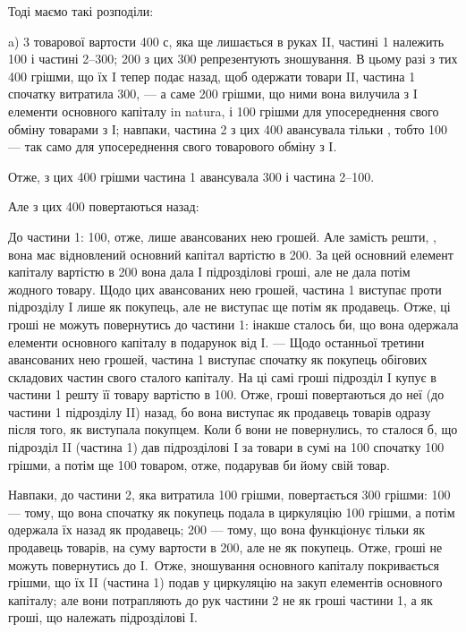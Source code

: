 Тоді маємо такі розподіли:

a) 3 товарової вартости \deq{} 400 с, яка ще лишається в руках II, частині
1 належить 100 і частині 2--300; 200 з цих 300 репрезентують
зношування. В цьому разі з тих 400 грішми, що їх I тепер
подає назад, щоб одержати товари II, частина 1 спочатку витратила 300,
— а саме 200 грішми, що ними вона вилучила з I елементи основного
капіталу in natura, і 100 грішми для упосереднення свого обміну товарами
з І; навпаки, частина 2 з цих 400 авансувала тільки , тобто
100 — так само для упосереднення свого товарового обміну з I.

Отже, з цих 400 грішми частина 1 авансувала 300 і частина
2--100.

Але з цих 400 повертаються назад:

До частини 1: 100, отже, лише  авансованих нею грошей. Але
замість решти, , вона має відновлений основний капітал вартістю в 200.
За цей основний елемент капіталу вартістю в 200 вона дала І підрозділові
гроші, але не дала потім жодного товару. Щодо цих 
авансованих нею грошей, частина 1 виступає проти підрозділу I лише як
покупець, але не виступає ще потім як продавець. Отже, ці гроші
не можуть повернутись до частини 1: інакше сталось би, що вона одержала
елементи основного капіталу в подарунок від I. — Щодо останньої
третини авансованих нею грошей, частина 1 виступає спочатку
як покупець обігових складових частин свого сталого капіталу. На ці
самі гроші підрозділ I купує в частини 1 решту її товару вартістю
в 100. Отже, гроші повертаються до неї (до частини 1 підрозділу II)
назад, бо вона виступає як продавець товарів одразу після того, як
виступала покупцем. Коли б вони не повернулись, то сталося б, що
підрозділ II (частина 1) дав підрозділові I за товари в сумі на 100 спочатку
100 грішми, а потім ще 100 товаром, отже, подарував би йому
свій товар.

Навпаки, до частини 2, яка витратила 100 грішми, повертається
300 грішми: 100 — тому, що вона спочатку як покупець подала в циркуляцію
100 грішми, а потім одержала їх назад як продавець; 200 —
тому, що вона функціонує тільки як продавець товарів, на суму вартости
в 200, але не як покупець. Отже, гроші не можуть повернутись до I.~Отже, зношування основного капіталу покривається грішми, що їх II
(частина 1) подав у циркуляцію на закуп елементів основного капіталу;
але вони потрапляють до рук частини 2 не як гроші частини 1, а як
гроші, що належать підрозділові I.

